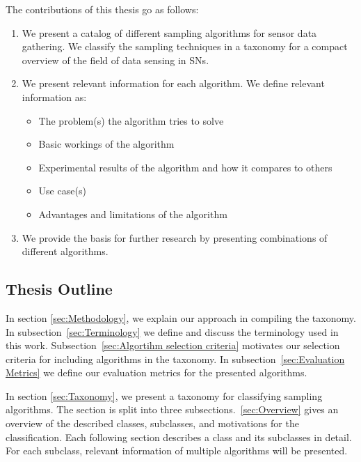 The contributions of this thesis go as follows: 
\begin{enumerate}
    \item We present a catalog of different sampling algorithms for sensor data
    gathering. We classify the sampling techniques in a taxonomy for a compact
    overview of the field of data sensing in \acp{SN}.
    \item We present relevant information for each algorithm. We define
    relevant information as:

        \begin{itemize}
            \item The problem(s) the algorithm tries to solve
            \item Basic workings of the algorithm
            \item Experimental results of the algorithm and how it compares to others
            \item Use case(s)
            \item Advantages and limitations of the algorithm
        \end{itemize}

    \item We provide the basis for further research by presenting combinations
    of different algorithms.
\end{enumerate}


\subsection{Thesis Outline}

  In section \ref{sec:Methodology}, we
explain our approach in compiling the taxonomy. In
subsection~\ref{sec:Terminology} we define and discuss the terminology used in
this work. Subsection~\ref{sec:Algortihm selection criteria} motivates our
selection criteria for including algorithms in the taxonomy. In
subsection~\ref{sec:Evaluation Metrics} we define our evaluation metrics for
the presented algorithms.

  In section \ref{sec:Taxonomy}, we present a
taxonomy for classifying sampling algorithms. The section is split into three
subsections.~\ref{sec:Overview} gives an overview of the described classes,
subclasses, and motivations for the classification. Each following section
describes a class and its subclasses in detail. For each subclass, relevant
information of multiple algorithms will be presented. 

